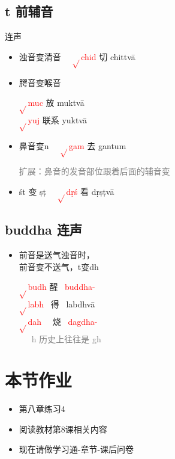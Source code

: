 \documentclass[17pt]{beamer}
\newcommand{\verbroot}[1]{\textcolor{red}{$\sqrt{}$#1}}
\newcommand{\nounstem}[1]{\textcolor{red}{#1\nobreakdash-}}
\newcommand{\fullpada}[1]{\textcolor{OliveGreen}{#1}}
\newcommand{\notsoimportant}[1]{\textcolor{gray}{#1}}
\begin{document}
\subsection{t 前辅音}
\begin{frame}{\insertsubsection 连声}
  \begin{itemize}
    \item 浊音变清音
    ~~\verbroot{chid} 切 \fullpada{chittvā}

    \item 腭音变喉音

    \verbroot{muc} 放 \fullpada{muktvā} \\
    \verbroot{yuj} 联系 \fullpada{yuktvā}
    \item 鼻音变n   
    ~~\verbroot{gam} 去 \fullpada{gantum} 

    {\small
    \notsoimportant{扩展：鼻音的发音部位跟着后面的辅音变}}
    \item śt 变 ṣṭ
    ~~\verbroot{dṛś} 看 \fullpada{dṛṣṭvā}  
  \end{itemize}  
\end{frame}

\subsection{buddha 连声}
\begin{frame}{\insertsubsection}
  \begin{itemize}
    \item 前音是送气浊音时，\\前音变不送气，t变dh 
    
    \verbroot{budh} 醒 ~\nounstem{buddha} \\
    \verbroot{labh} ~得 ~\fullpada{labdhvā} \\
    \verbroot{dah} ~~烧 ~\nounstem{dagdha} \\
    ~~~\notsoimportant{h 历史上往往是 gh}
  \end{itemize}  
\end{frame}

\section{本节作业}

\begin{frame}{\insertsection }
  \begin{itemize}

    \item
      第八章练习4
    \item
      阅读教材第8课相关内容
    \bigskip
    \item
      现在请做学习通\nobreakdash-章节\nobreakdash-课后问卷
  \end{itemize}
\end{frame}  
\end{document}

